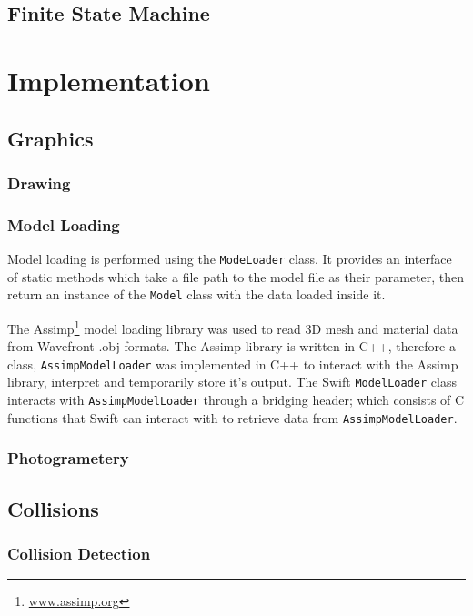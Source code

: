 \documentclass{cmppgr}
\begin{document}
\subsection{Finite State Machine}


\section{Implementation}

\subsection{Graphics}
\subsubsection{Drawing}
\subsubsection{Model Loading}
Model loading is performed using the \texttt{ModeLoader} class. It provides an interface of static methods which take a file path to the model file as their parameter, then return an instance of the \texttt{Model} class with the data loaded inside it. 

The Assimp\footnote{\url{www.assimp.org}} model loading library was used to read 3D mesh and material data from Wavefront .obj formats. The Assimp library is written in C++, therefore a class, \texttt{AssimpModelLoader} was implemented in C++ to interact with the Assimp library, interpret and temporarily store it's output. The Swift \texttt{ModelLoader} class interacts with \texttt{AssimpModelLoader} through a bridging header; which consists of C functions that Swift can interact with to retrieve data from \texttt{AssimpModelLoader}. 

\subsubsection{Photogrametery}


\subsection{Collisions}
\subsubsection{Collision Detection}
\end{document}
